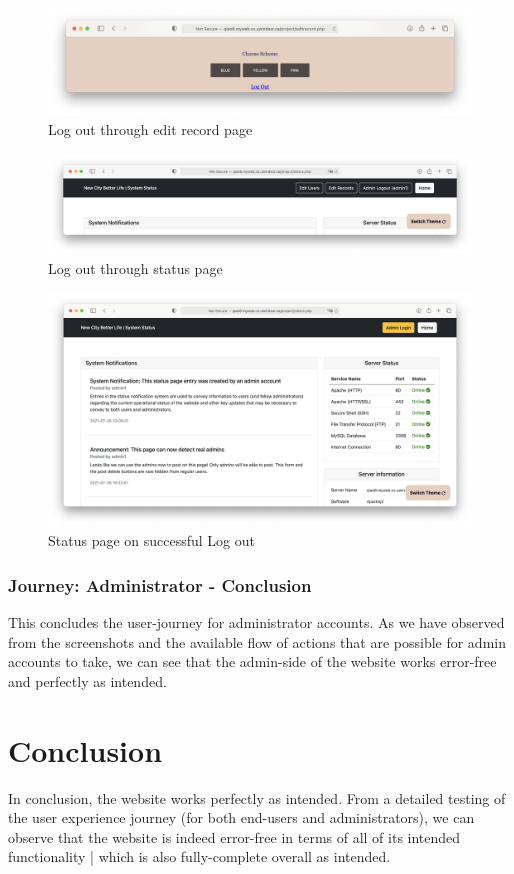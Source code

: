\documentclass[12pt, letterpaper]{article}
\begin{document}
\begin{figure}[htbp]
\centering
\includegraphics[width=\textwidth]{images/30-journey-a07b.png}
\caption{Log out through edit record page}
\end{figure}

\begin{figure}[htbp]
\centering
\includegraphics[width=\textwidth]{images/30-journey-a07c.png}
\caption{Log out through status page}
\end{figure}

\newpage

\begin{figure}[htbp]
\centering
\includegraphics[width=\textwidth]{images/30-journey-a07d.png}
\caption{Status page on successful Log out}
\end{figure}

\subsubsection*{Journey: Administrator - Conclusion}
This concludes the user-journey for administrator accounts. As we have observed from the screenshots and the available flow of actions that are possible for admin accounts to take, we can see that the admin-side of the website works error-free and perfectly as intended.

\section{Conclusion}
In conclusion, the website works perfectly as intended. From a detailed testing of the user experience journey (for both end-users and administrators), we can observe that the website is indeed error-free in terms of all of its intended functionality | which is also fully-complete overall as intended.
\end{document}
